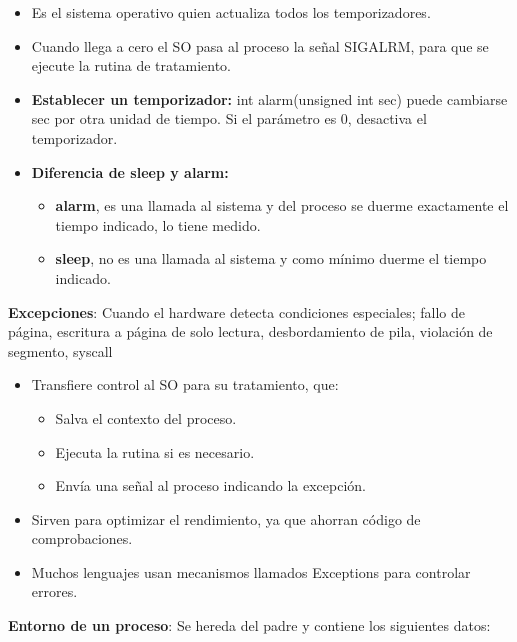 \documentclass[12pt, twoside, openright]{report} %
\begin{document}
  \begin{itemize}
  \item Es el sistema operativo quien actualiza todos los temporizadores.
    
  \item Cuando llega a cero el SO pasa al proceso la señal SIGALRM, para que
    se ejecute la rutina de tratamiento.
    
  \end{itemize}

  \begin{itemize}
  \item \textbf{Establecer un temporizador:} int alarm(unsigned int sec)
    puede cambiarse sec por otra unidad de tiempo. Si el parámetro es 0,
    desactiva el temporizador.
    
  \item \textbf{Diferencia de sleep y alarm:}
    

    \begin{itemize}
    \item \textbf{alarm}, es una llamada al sistema y del proceso se duerme
      exactamente el tiempo indicado, lo tiene medido.
      
    \item \textbf{sleep}, no es una llamada al sistema y como mínimo duerme
      el tiempo indicado.
      
    \end{itemize}
  \end{itemize}
\textbf{Excepciones}: Cuando el hardware detecta condiciones
  especiales; fallo de página, escritura a página de solo lectura,
  desbordamiento de pila, violación de segmento, syscall
  
  \vspace{-0.5cm}

  \begin{itemize}
  \item Transfiere control al SO para su tratamiento, que:
    

    \begin{itemize}
    \item Salva el contexto del proceso.
      
    \item Ejecuta la rutina si es necesario.
      
    \item Envía una señal al proceso indicando la excepción.
      
    \end{itemize}
  \item Sirven para optimizar el rendimiento, ya que ahorran código de
    comprobaciones.
    
  \item Muchos lenguajes usan mecanismos llamados Exceptions para controlar
    errores.
    
  \end{itemize}
\textbf{Entorno de un proceso}: Se hereda del padre y contiene los
  siguientes datos:
  
\end{document}
